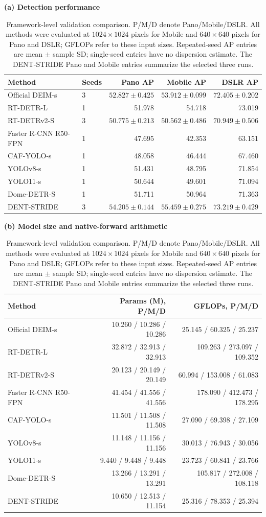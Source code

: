 \documentclass[a4paper,fleqn]{cas-dc}
\begin{document}
\begin{table}[pos=t,width=\textwidth]
\caption{Framework-level validation comparison. P/M/D denote Pano/Mobile/DSLR. All methods were evaluated at $1024\times1024$ pixels for Mobile and $640\times640$ pixels for Pano and DSLR; GFLOPs refer to these input sizes. Repeated-seed AP entries are mean $\pm$ sample SD; single-seed entries have no dispersion estimate. The DENT-STRIDE Pano and Mobile entries summarize the selected three runs.}
\label{tab:table4}
\centering
\footnotesize
\textbf{(a) Detection performance}\par\smallskip
\begin{tabular*}{\textwidth}{@{\extracolsep{\fill}}llrrr@{}}
\toprule
Method & Seeds & Pano AP & Mobile AP & DSLR AP \\
\midrule
Official DEIM-s & 3 & $52.827\pm0.425$ & $53.912\pm0.099$ & $72.405\pm0.202$ \\
RT-DETR-L & 1 & 51.978 & 54.718 & 73.019 \\
RT-DETRv2-S & 3 & $50.775\pm0.213$ & $50.562\pm0.486$ & $70.949\pm0.506$ \\
Faster R-CNN R50-FPN & 1 & 47.695 & 42.353 & 63.151 \\
CAF-YOLO-s & 1 & 48.058 & 46.444 & 67.460 \\
YOLOv8-s & 1 & 51.431 & 48.795 & 71.854 \\
YOLO11-s & 1 & 50.644 & 49.601 & 71.094 \\
Dome-DETR-S & 1 & 51.711 & 50.964 & 71.363 \\
DENT-STRIDE & 3 & $54.205\pm0.144$ & $55.459\pm0.275$ & $73.219\pm0.429$ \\
\bottomrule
\end{tabular*}
\par\medskip
\textbf{(b) Model size and native-forward arithmetic}\par\smallskip
\begin{tabular*}{\textwidth}{@{\extracolsep{\fill}}lrr@{}}
\toprule
Method & Params (M), P/M/D & GFLOPs, P/M/D \\
\midrule
Official DEIM-s & 10.260 / 10.286 / 10.286 & 25.145 / 60.325 / 25.237 \\
RT-DETR-L & 32.872 / 32.913 / 32.913 & 109.263 / 273.097 / 109.352 \\
RT-DETRv2-S & 20.123 / 20.149 / 20.149 & 60.994 / 153.008 / 61.083 \\
Faster R-CNN R50-FPN & 41.454 / 41.556 / 41.556 & 178.090 / 412.473 / 178.295 \\
CAF-YOLO-s & 11.501 / 11.508 / 11.508 & 27.090 / 69.398 / 27.109 \\
YOLOv8-s & 11.148 / 11.156 / 11.156 & 30.013 / 76.943 / 30.056 \\
YOLO11-s & 9.440 / 9.448 / 9.448 & 23.723 / 60.841 / 23.766 \\
Dome-DETR-S & 13.266 / 13.291 / 13.291 & 105.817 / 272.008 / 108.118 \\
DENT-STRIDE & 10.650 / 12.513 / 11.154 & 25.316 / 78.353 / 25.394 \\
\bottomrule
\end{tabular*}
\end{table}
\end{document}
